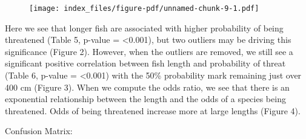 \documentclass[
  letterpaper,
  DIV=11,
  numbers=noendperiod]{scrartcl}
\begin{document}
\begin{figure}[H]

{\centering \texttt{[image: index\_files/figure-pdf/unnamed-chunk-9-1.pdf]}

}

\end{figure}

Here we see that longer fish are associated with higher probability of
being threatened (Table 5, p-value = \textless0.001), but two outliers
may be driving this significance (Figure 2). However, when the outliers
are removed, we still see a significant positive correlation between
fish length and probability of threat (Table 6, p-value =
\textless0.001) with the 50\% probability mark remaining just over 400
cm (Figure 3). When we compute the odds ratio, we see that there is an
exponential relationship between the length and the odds of a species
being threatened. Odds of being threatened increase more at large
lengths (Figure 4).

Confusion Matrix:
\end{document}
